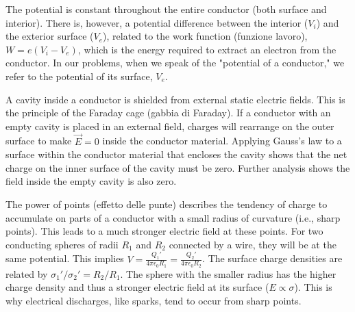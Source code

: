 The potential is constant throughout the entire conductor (both surface and interior). There is, however, a potential difference between the interior (\(V_i\)) and the exterior surface (\(V_e\)), related to the work function (funzione lavoro), \(W = e(V_i - V_e)\), which is the energy required to extract an electron from the conductor. In our problems, when we speak of the "potential of a conductor," we refer to the potential of its surface, \(V_e\).

A cavity inside a conductor is shielded from external static electric fields. This is the principle of the Faraday cage (gabbia di Faraday). If a conductor with an empty cavity is placed in an external field, charges will rearrange on the outer surface to make \(\vec{E}=0\) inside the conductor material. Applying Gauss's law to a surface within the conductor material that encloses the cavity shows that the net charge on the inner surface of the cavity must be zero. Further analysis shows the field inside the empty cavity is also zero.

The power of points (effetto delle punte) describes the tendency of charge to accumulate on parts of a conductor with a small radius of curvature (i.e., sharp points). This leads to a much stronger electric field at these points. For two conducting spheres of radii \(R_1\) and \(R_2\) connected by a wire, they will be at the same potential. This implies \(V = \frac{Q_1'}{4\pi\epsilon_0 R_1} = \frac{Q_2'}{4\pi\epsilon_0 R_2}\). The surface charge densities are related by \(\sigma_1' / \sigma_2' = R_2 / R_1\). The sphere with the smaller radius has the higher charge density and thus a stronger electric field at its surface (\(E \propto \sigma\)). This is why electrical discharges, like sparks, tend to occur from sharp points.
